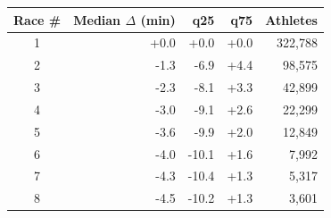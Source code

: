 \begin{tabular}{crrrr}
\toprule
\multicolumn{1}{c}{\textbf{Race \#}} & \multicolumn{1}{r}{\textbf{Median $\Delta$ (min)}} & \multicolumn{1}{r}{\textbf{q25}} & \multicolumn{1}{r}{\textbf{q75}} & \multicolumn{1}{r}{\textbf{Athletes}} \\
\midrule
1 & +0.0 & +0.0 & +0.0 & 322,788 \\
2 & -1.3 & -6.9 & +4.4 & 98,575 \\
3 & -2.3 & -8.1 & +3.3 & 42,899 \\
4 & -3.0 & -9.1 & +2.6 & 22,299 \\
5 & -3.6 & -9.9 & +2.0 & 12,849 \\
6 & -4.0 & -10.1 & +1.6 & 7,992 \\
7 & -4.3 & -10.4 & +1.3 & 5,317 \\
8 & -4.5 & -10.2 & +1.3 & 3,601 \\
\bottomrule
\end{tabular}